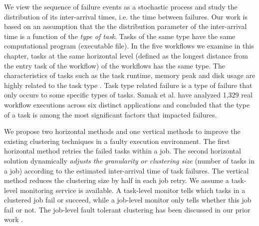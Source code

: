 We view the sequence of failure events as a stochastic process and study the distribution of its inter-arrival times, i.e. the time between failures. Our work is based on an assumption that the the distribution parameter of the inter-arrival time is a function of the \emph{type of task}. Tasks of the same type have the same computational program (executable file). In the five workflows we examine in this chapter, tasks at the same horizontal level (defined as the longest distance from the entry task of the workflow) of the workflows has the same type. 
The characteristics of tasks such as the task runtime, memory peak and disk usage are highly related to the task type \cite{da2013toward, Juve2013}.
Task type related failure is a type of failure that only occurs to some specific types of tasks. Samak \cite{Samak2011} et al. have analyzed 1,329 real workflow executions across six distinct applications and concluded that the type of a task is among the most significant factors that impacted failures. 

We propose two horizontal methods and one vertical methods to improve the existing clustering techniques in a faulty execution environment. The first horizontal method retries the failed tasks within a job. The second horizontal solution dynamically \emph{adjusts the granularity or clustering size} (number of tasks in a job) according to the estimated inter-arrival time of task failures. The vertical method reduces the clustering size by half in each job retry. 
We assume a task-level monitoring service is available. A task-level monitor tells which tasks in a clustered job fail or succeed, while a job-level monitor only tells whether this job fail or not. The job-level fault tolerant clustering has been discussed in our prior work \cite{Chen2012}. 



